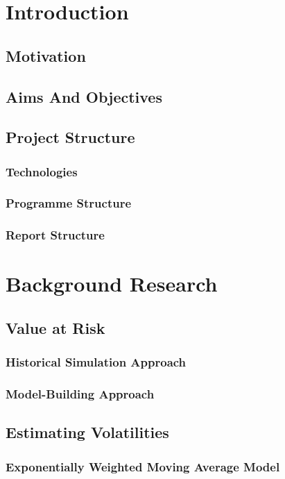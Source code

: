 \documentclass[11pt]{article} %
\theoremstyle{plain}
\theoremstyle{definition}
\begin{document}
\clearpage

\section{Introduction}
\subsection{Motivation}
\subsection{Aims And Objectives}
\subsection{Project Structure}
\subsubsection{Technologies}
\subsubsection{Programme Structure}
\subsubsection{Report Structure}

\section{Background Research}
\subsection{Value at Risk}
\subsubsection{Historical Simulation Approach}
\subsubsection{Model-Building Approach}

\subsection{Estimating Volatilities}
\subsubsection{Exponentially Weighted Moving Average Model}
\end{document}
